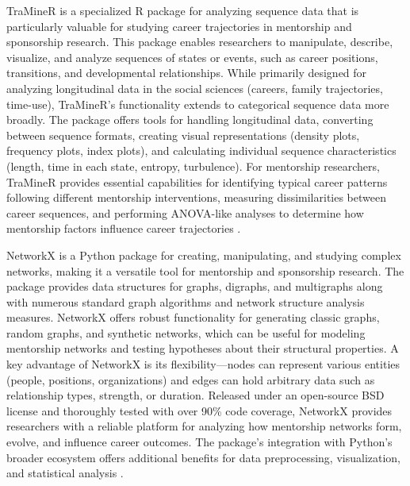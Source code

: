 \documentclass[main.tex]{subfiles}
\begin{document}
TraMineR is a specialized R package for analyzing sequence data that is particularly valuable for studying career trajectories in mentorship and sponsorship research. This package enables researchers to manipulate, describe, visualize, and analyze sequences of states or events, such as career positions, transitions, and developmental relationships. While primarily designed for analyzing longitudinal data in the social sciences (careers, family trajectories, time-use), TraMineR's functionality extends to categorical sequence data more broadly. The package offers tools for handling longitudinal data, converting between sequence formats, creating visual representations (density plots, frequency plots, index plots), and calculating individual sequence characteristics (length, time in each state, entropy, turbulence). For mentorship researchers, TraMineR provides essential capabilities for identifying typical career patterns following different mentorship interventions, measuring dissimilarities between career sequences, and performing ANOVA-like analyses to determine how mentorship factors influence career trajectories \parencite{traminer2023sequence}.

NetworkX is a Python package for creating, manipulating, and studying complex networks, making it a versatile tool for mentorship and sponsorship research. The package provides data structures for graphs, digraphs, and multigraphs along with numerous standard graph algorithms and network structure analysis measures. NetworkX offers robust functionality for generating classic graphs, random graphs, and synthetic networks, which can be useful for modeling mentorship networks and testing hypotheses about their structural properties. A key advantage of NetworkX is its flexibility—nodes can represent various entities (people, positions, organizations) and edges can hold arbitrary data such as relationship types, strength, or duration. Released under an open-source BSD license and thoroughly tested with over 90\% code coverage, NetworkX provides researchers with a reliable platform for analyzing how mentorship networks form, evolve, and influence career outcomes. The package's integration with Python's broader ecosystem offers additional benefits for data preprocessing, visualization, and statistical analysis \parencite{networkx2023documentation}.
\end{document}

